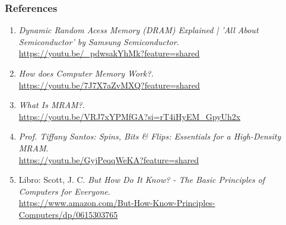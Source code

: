 \documentclass[aspectratio=169]{beamer}
\begin{document}
\begin{frame}[noframenumbering]
    \frametitle{References}
    {\footnotesize
    \begin{enumerate}
        \item \textit{Dynamic Random Acess Memory (DRAM) Explained | 'All About Semiconductor' by Samsung Semiconductor}. \\ 
            \url{https://youtu.be/_pdwsakYhMk?feature=shared}

        \item \textit{How does Computer Memory Work?}. \\
            \url{https://youtu.be/7J7X7aZvMXQ?feature=shared}

        \item \textit{What Is MRAM?}. \\ 
            \url{https://youtu.be/VRJ7xYPMfGA?si=rT4iHyEM_GpyUh2x}
    
        \item \textit{Prof. Tiffany Santos: Spins, Bits \& Flips: Essentials for a High-Density MRAM}. \\ 
            \url{https://youtu.be/GyjPeqqWeKA?feature=shared}

        \item Libro: Scott, J. C. \textit{But How Do It Know? - The Basic Principles of Computers for Everyone}. \\ 
            \url{https://www.amazon.com/But-How-Know-Principles-Computers/dp/0615303765}
    \end{enumerate}}
\end{frame}
\end{document}

